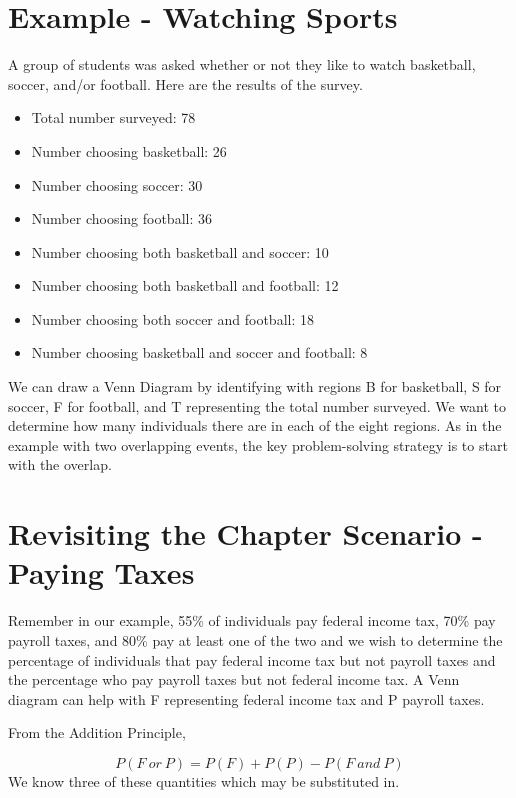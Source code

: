 \documentclass[]{book}
\providecommand{\tightlist}{%
  \setlength{\itemsep}{0pt}\setlength{\parskip}{0pt}}
\theoremstyle{definition}
\theoremstyle{definition}
\theoremstyle{definition}
\theoremstyle{remark}
\begin{document}
\section{Example - Watching Sports}\label{example---watching-sports}

A group of students was asked whether or not they like to watch
basketball, soccer, and/or football. Here are the results of the survey.

\begin{itemize}
\tightlist
\item
  Total number surveyed: 78
\item
  Number choosing basketball: 26
\item
  Number choosing soccer: 30
\item
  Number choosing football: 36
\item
  Number choosing both basketball and soccer: 10
\item
  Number choosing both basketball and football: 12
\item
  Number choosing both soccer and football: 18
\item
  Number choosing basketball and soccer and football: 8
\end{itemize}

We can draw a Venn Diagram by identifying with regions B for basketball,
S for soccer, F for football, and T representing the total number
surveyed. We want to determine how many individuals there are in each of
the eight regions. As in the example with two overlapping events, the
key problem-solving strategy is to start with the overlap.

\section{Revisiting the Chapter Scenario - Paying
Taxes}\label{revisit_chapter_scenario}

Remember in our example, 55\% of individuals pay federal income tax,
70\% pay payroll taxes, and 80\% pay at least one of the two and we wish
to determine the percentage of individuals that pay federal income tax
but not payroll taxes and the percentage who pay payroll taxes but not
federal income tax. A Venn diagram can help with F representing federal
income tax and P payroll taxes.

From the Addition Principle,

\[P(F \ or \ P)=P(F)+P(P)-P(F \ and \ P)\] We know three of these
quantities which may be substituted in.
\end{document}
